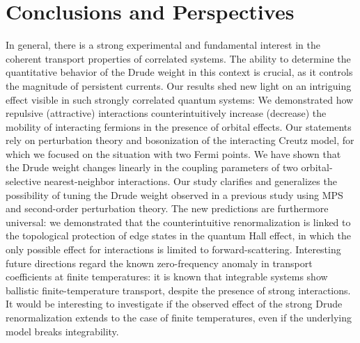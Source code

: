 %
\chapter*{Conclusions and Perspectives}
%
In general, there is a strong experimental and fundamental interest in the coherent transport properties of correlated systems.
The ability to determine the quantitative behavior of the Drude weight in this context is crucial, as it controls the magnitude of persistent currents.
Our results shed new light on an intriguing effect visible in such strongly correlated quantum systems: We demonstrated how repulsive (attractive) interactions counterintuitively increase (decrease) the mobility of interacting fermions in the presence of orbital effects.
Our statements rely on perturbation theory and bosonization of the interacting Creutz model, for which we focused on the situation with two Fermi points.
We have shown that the Drude weight changes linearly in the coupling parameters of two orbital- selective nearest-neighbor interactions.
Our study clarifies and generalizes the possibility of tuning the Drude weight observed in a previous study using MPS and second-order perturbation theory.
The new predictions are furthermore universal: we demonstrated that the counterintuitive renormalization is linked to the topological protection of edge states in the quantum Hall effect, in which the only possible effect for interactions is limited to forward-scattering.
Interesting future directions regard the known zero-frequency anomaly in transport coefficients at finite temperatures: it is known that integrable systems show ballistic finite-temperature transport, despite the presence of strong interactions.
It would be interesting to investigate if the observed effect of the strong Drude renormalization extends to the case of finite temperatures, even if the underlying model breaks integrability.


